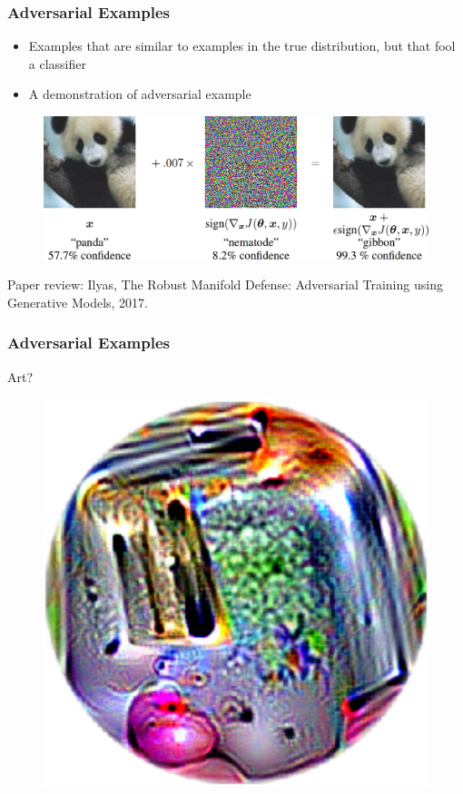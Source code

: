 \documentclass{beamer}
\begin{document}
\begin{frame}
\frametitle{Adversarial Examples}
\begin{itemize}
\item Examples that are similar to examples in the true distribution, but that fool a classifier \cite{Szegedy2013}
\item A demonstration of adversarial example \cite{Goodfellow2014a}
\end{itemize}
\begin{figure}
  \includegraphics[width=.8\textwidth]{panda.png}
\end{figure}
Paper review: Ilyas, The Robust Manifold Defense: Adversarial Training using Generative Models, 2017.
\end{frame}

\begin{frame}
\frametitle{Adversarial Examples}
Art?
\begin{figure}
  \includegraphics[height=.7\textheight]{adversarial_patch.jpg}
\end{figure}
\end{frame}
\end{document}
